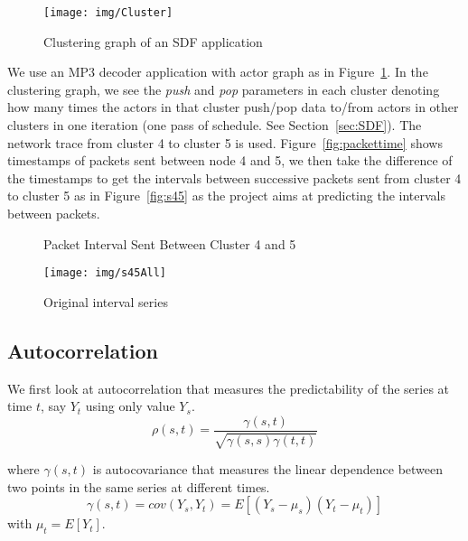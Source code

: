 \documentclass[12pt]{article}
\begin{document}
\begin{figure}[ht!]
\centering
\texttt{[image: img/Cluster]}
\caption{Clustering graph of an SDF application}\label{fig:Cluster}
\end{figure}

We use an MP3 decoder application with actor graph as in
Figure~\ref{fig:Cluster}. In the clustering graph, we see the \textit{push} and
\textit{pop} parameters in each cluster denoting how many times the actors in
that cluster push/pop data to/from actors in other clusters in one iteration
(one pass of schedule. See Section~\ref{sec:SDF}). The network trace from
cluster 4 to cluster 5 is used. Figure~\ref{fig:packettime} shows timestamps of
packets sent between node 4 and 5, we then take the difference of the timestamps to get the intervals between successive packets sent from cluster 4 to cluster 5
as in Figure~\ref{fig:s45} as the project aims at predicting the intervals between packets.

\begin{figure*}[ht!]
\centering
{}
\caption{Packet Interval Sent Between Cluster 4 and 5}
\end{figure*}

\begin{figure}[ht!]
\centering
\texttt{[image: img/s45All]}
\caption{Original interval series}\label{fig:s45All}
\end{figure}

\subsection{Autocorrelation}
We first look at autocorrelation that measures the predictability of the series
at time $t$, say $Y_t$ using only value $Y_s$.
\begin{equation}
\rho(s,t)=\frac{\gamma(s,t)}{\sqrt{\gamma(s,s)\gamma(t,t)}}
\end{equation}

where $\gamma(s,t)$ is autocovariance that measures the linear dependence
between two points in the same series at different times.
\begin{equation}
\gamma(s,t)=cov(Y_s, Y_t)=E[(Y_s-\mu_s)(Y_t-\mu_t)]
\end{equation}
with $\mu_t=E[Y_t]$.
\end{document}
